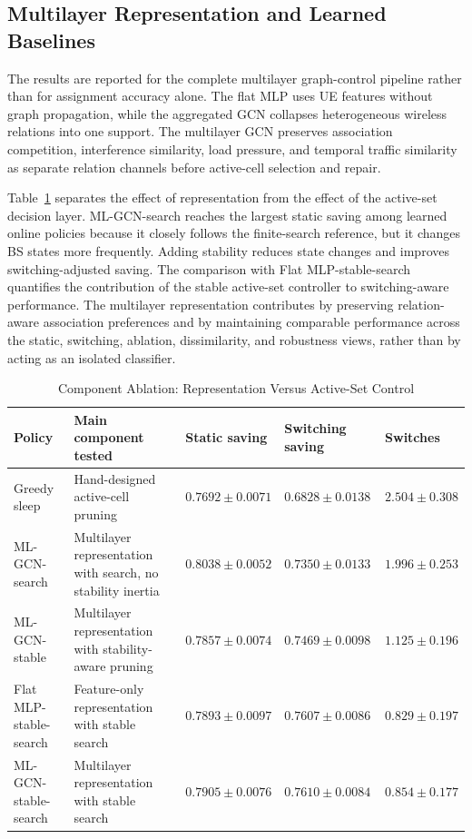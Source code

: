 \documentclass[journal]{IEEEtran}
\begin{document}
\subsection{Multilayer Representation and Learned Baselines}
The results are reported for the complete multilayer graph-control pipeline
rather than for assignment accuracy alone.
The flat MLP uses UE features without graph propagation, while the aggregated
GCN collapses heterogeneous wireless relations into one support. The
multilayer GCN preserves association competition, interference similarity,
load pressure, and temporal traffic similarity as separate relation channels
before active-cell selection and repair.

Table~\ref{tab:component_ablation} separates the effect of representation from
the effect of the active-set decision layer. ML-GCN-search reaches the largest
static saving among learned online policies because it closely follows the
finite-search reference, but it changes BS states more frequently. Adding
stability reduces state changes and improves switching-adjusted saving. The
comparison with Flat MLP-stable-search quantifies the contribution of the
stable active-set controller to switching-aware performance. The multilayer
representation contributes by preserving
relation-aware association preferences and by maintaining comparable performance across the
static, switching, ablation, dissimilarity, and robustness views, rather than
by acting as an isolated classifier.

\begin{table}[!t]
\caption{Component Ablation: Representation Versus Active-Set Control}
\label{tab:component_ablation}
\centering
\small
\setlength{\tabcolsep}{4pt}
\begin{tabular}{p{}p{}p{}p{}p{}}
\toprule
Policy & Main component tested & Static saving & Switching saving & Switches \\
\midrule
Greedy sleep & Hand-designed active-cell pruning & $0.7692\pm0.0071$ & $0.6828\pm0.0138$ & $2.504\pm0.308$ \\
ML-GCN-search & Multilayer representation with search, no stability inertia & $0.8038\pm0.0052$ & $0.7350\pm0.0133$ & $1.996\pm0.253$ \\
ML-GCN-stable & Multilayer representation with stability-aware pruning & $0.7857\pm0.0074$ & $0.7469\pm0.0098$ & $1.125\pm0.196$ \\
Flat MLP-stable-search & Feature-only representation with stable search & $0.7893\pm0.0097$ & $0.7607\pm0.0086$ & $0.829\pm0.197$ \\
ML-GCN-stable-search & Multilayer representation with stable search & $0.7905\pm0.0076$ & $0.7610\pm0.0084$ & $0.854\pm0.177$ \\
\bottomrule
\end{tabular}
\end{table}
\end{document}
